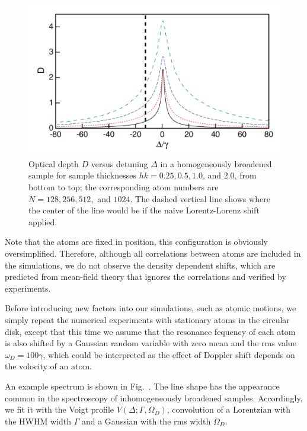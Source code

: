 \begin{figure}[h!]
\begin{center}
\includegraphics[width=\textwidth]{homo_D.pdf}
\end{center}
\caption{Optical depth $D$ versus detuning $\Delta$ in a homogeneously broadened sample for sample thicknesses $hk=0.25, 0.5, 1.0$, and $2.0$, from bottom to top; the corresponding atom numbers are $N=128, 256, 512,$ and $1024$. The dashed vertical line shows where the center of the line would be if the naive Lorentz-Lorenz shift applied.}
\label{HOMO_D}
\end{figure}

Note that the atoms are fixed in position, this configuration is obviously oversimplified. Therefore, although all correlations between atoms are included in the simulations, we do not observe the density dependent shifts, which are predicted from mean-field theory that ignores the correlations and verified by experiments.

Before introducing new factors into our simulations, such as atomic motions, we simply repeat the numerical experiments with stationary atoms in the circular disk, except that this time we assume that the resonance fequency of each atom is also shifted by a Gaussian random variable with zero mean and the rms value $\omega_D=100\gamma$, which could be interpreted as the effect of Doppler shift depends on the volocity of an atom.

An example spectrum is shown in Fig.~. The line shape has the appearance common in the spectroscopy of inhomogeneously broadened samples. Accordingly, we fit it with the Voigt profile $V(\Delta;\Gamma,\Omega_D)$, convolution of a Lorentzian with the HWHM width $\Gamma$ and a Gaussian with the rms width $\Omega_D$. 

